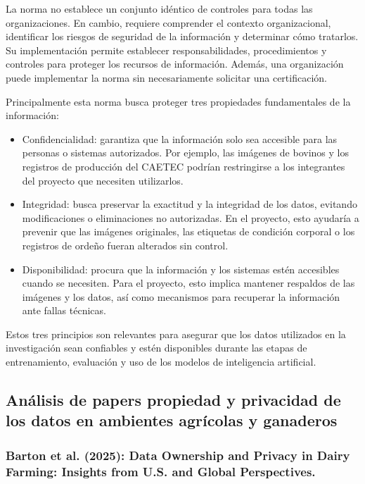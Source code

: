 La norma no establece un conjunto idéntico de controles para todas las organizaciones. En cambio, requiere comprender el contexto organizacional, identificar los riesgos de seguridad de la información y determinar cómo tratarlos. Su implementación permite establecer responsabilidades, procedimientos y controles para proteger los recursos de información. Además, una organización puede implementar la norma sin necesariamente solicitar una certificación.

Principalmente esta norma busca proteger tres propiedades fundamentales de la información:

\begin{itemize}
  \item Confidencialidad: garantiza que la información solo sea accesible para las personas o sistemas autorizados. Por ejemplo, las imágenes de bovinos y los registros de producción del CAETEC podrían restringirse a los integrantes del proyecto que necesiten utilizarlos.
  \item Integridad: busca preservar la exactitud y la integridad de los datos, evitando modificaciones o eliminaciones no autorizadas. En el proyecto, esto ayudaría a prevenir que las imágenes originales, las etiquetas de condición corporal o los registros de ordeño fueran alterados sin control.
  \item Disponibilidad: procura que la información y los sistemas estén accesibles cuando se necesiten. Para el proyecto, esto implica mantener respaldos de las imágenes y los datos, así como mecanismos para recuperar la información ante fallas técnicas.
\end{itemize}

Estos tres principios son relevantes para asegurar que los datos utilizados en la investigación sean confiables y estén disponibles durante las etapas de entrenamiento, evaluación y uso de los modelos de inteligencia artificial.

\subsection{Análisis de papers propiedad y privacidad de los datos en ambientes agrícolas y ganaderos}

\subsubsection{Barton et al. (2025): Data Ownership and Privacy in Dairy Farming: Insights from U.S. and Global Perspectives.}

